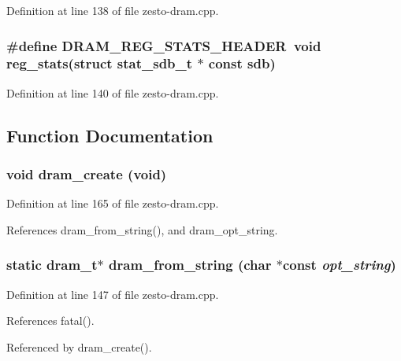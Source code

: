 Definition at line 138 of file zesto-dram.cpp.
\subsubsection[{DRAM\_\-REG\_\-STATS\_\-HEADER}]{\setlength{\rightskip}{0pt plus 5cm}\#define DRAM\_\-REG\_\-STATS\_\-HEADER~void reg\_\-stats(struct {\bf stat\_\-sdb\_\-t} $\ast$ const sdb)}\label{zesto-dram_8cpp_bbc530f36172b9d51c5ba2b40a7d05ca}




Definition at line 140 of file zesto-dram.cpp.

\subsection{Function Documentation}
\subsubsection[{dram\_\-create}]{\setlength{\rightskip}{0pt plus 5cm}void dram\_\-create (void)}\label{zesto-dram_8cpp_213d02d3a2f53f24d8ac9e8956b64f13}




Definition at line 165 of file zesto-dram.cpp.

References dram\_\-from\_\-string(), and dram\_\-opt\_\-string.
\subsubsection[{dram\_\-from\_\-string}]{\setlength{\rightskip}{0pt plus 5cm}static {\bf dram\_\-t}$\ast$ dram\_\-from\_\-string (char $\ast$const  {\em opt\_\-string})\hspace{0.3cm}{\tt  [static]}}\label{zesto-dram_8cpp_32a8dd812947abef74cd51c932d75127}




Definition at line 147 of file zesto-dram.cpp.

References fatal().

Referenced by dram\_\-create().

